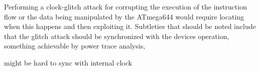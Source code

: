 Performing a clock-glitch attack for corrupting the execution of the instruction flow or the data being manipulated by the ATmega644 would require locating when this happens and then exploiting it. Subtleties that should be noted include that the glitch attack should be synchronized with the devices operation, something achievable by power trace analysis, 

might be hard to sync with internal clock


